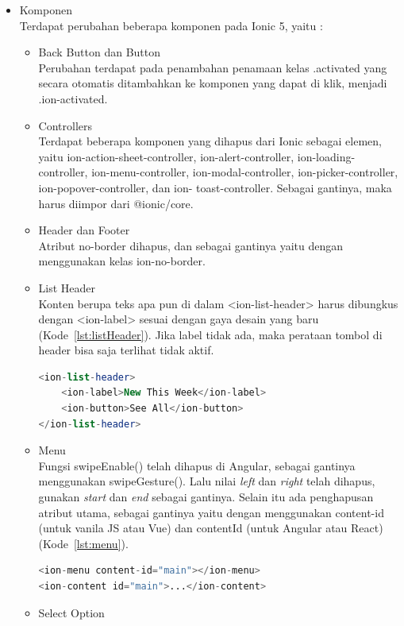 \begin{enumerate}
\begin{itemize}
		\item Komponen\\
		Terdapat perubahan beberapa komponen pada Ionic 5, yaitu :
		\begin{itemize}
			\item Back Button dan Button  \\
			Perubahan terdapat pada penambahan penamaan kelas .activated yang secara otomatis ditambahkan ke komponen yang dapat di klik, menjadi .ion-activated.
			\item Controllers\\
			Terdapat beberapa komponen yang dihapus dari Ionic sebagai elemen, yaitu ion-action-sheet-controller, ion-alert-controller, ion-loading-controller, ion-menu-controller, ion-modal-controller, ion-picker-controller, ion-popover-controller, dan ion- toast-controller. Sebagai gantinya, maka harus diimpor dari @ionic/core. 
			\item Header dan Footer\\
			Atribut no-border dihapus, dan sebagai gantinya yaitu dengan menggunakan kelas ion-no-border.
			\item List Header\\
			Konten berupa teks apa pun di dalam <ion-list-header> harus dibungkus dengan <ion-label> sesuai dengan gaya desain yang baru (Kode~\ref{lst:listHeader}). Jika label tidak ada, maka perataan tombol di header bisa saja terlihat tidak aktif. 
			\begin{lstlisting}[language=php, label={lst:listHeader}, caption=Kode Program untuk List Header]
<ion-list-header>
	<ion-label>New This Week</ion-label>
	<ion-button>See All</ion-button>
</ion-list-header>
			\end{lstlisting}
			\item Menu\\
			Fungsi swipeEnable() telah dihapus di Angular, sebagai gantinya menggunakan swipeGesture(). Lalu nilai {\it left} dan {\it right} telah dihapus, gunakan {\it start} dan {\it end} sebagai gantinya. Selain itu ada penghapusan atribut utama, sebagai gantinya yaitu dengan menggunakan content-id (untuk vanila JS atau Vue) dan contentId (untuk Angular atau React) (Kode~\ref{lst:menu}).
			\begin{lstlisting}[language=php, label={lst:menu}, caption=Kode Program untuk Menu]
<ion-menu content-id="main"></ion-menu>
<ion-content id="main">...</ion-content>
			\end{lstlisting}
			\item Select Option \\

\end{itemize}
\end{itemize}
\end{enumerate}
